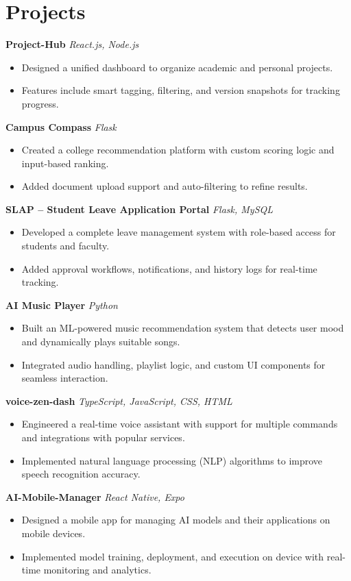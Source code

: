 \documentclass[a4paper,12pt]{article}
\begin{document}

\section*{Projects}

\textbf{Project-Hub}  
\textit{React.js, Node.js}
\begin{itemize}
    \item Designed a unified dashboard to organize academic and personal projects.
    \item Features include smart tagging, filtering, and version snapshots for tracking progress.
\end{itemize}

\textbf{Campus Compass}  
\textit{Flask}
\begin{itemize}
    \item Created a college recommendation platform with custom scoring logic and input-based ranking.
    \item Added document upload support and auto-filtering to refine results.
\end{itemize}

\textbf{SLAP – Student Leave Application Portal}  
\textit{Flask, MySQL}
\begin{itemize}
    \item Developed a complete leave management system with role-based access for students and faculty.
    \item Added approval workflows, notifications, and history logs for real-time tracking.
\end{itemize}

\textbf{AI Music Player}  
\textit{Python}
\begin{itemize}
    \item Built an ML-powered music recommendation system that detects user mood and dynamically plays suitable songs.
    \item Integrated audio handling, playlist logic, and custom UI components for seamless interaction.
\end{itemize}

\textbf{voice-zen-dash}  
\textit{TypeScript, JavaScript, CSS, HTML}
\begin{itemize}
    \item Engineered a real-time voice assistant with support for multiple commands and integrations with popular services.
    \item Implemented natural language processing (NLP) algorithms to improve speech recognition accuracy.
\end{itemize}

\textbf{AI-Mobile-Manager}  
\textit{React Native, Expo}
\begin{itemize}
    \item Designed a mobile app for managing AI models and their applications on mobile devices.
    \item Implemented model training, deployment, and execution on device with real-time monitoring and analytics.
\end{itemize}
\end{document}
